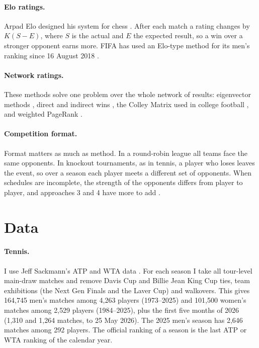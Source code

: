 \documentclass[11pt]{article}
\begin{document}
\paragraph{Elo ratings.} Arpad Elo designed his system for chess \citep{elo1978}. After each match a rating changes by $K(S-E)$, where $S$ is the actual and $E$ the expected result, so a win over a stronger opponent earns more. FIFA has used an Elo-type method for its men's ranking since 16 August 2018 \citep{wiki_fifa}.

\paragraph{Network ratings.} These methods solve one problem over the whole network of results: eigenvector methods \citep{keener1993}, direct and indirect wins \citep{park2005}, the Colley Matrix used in college football \citep{colley2002,wiki_colley}, and weighted PageRank \citep{radicchi2011,govan2008,lazova2015}.

\paragraph{Competition format.} Format matters as much as method. In a round-robin league all teams face the same opponents. In knockout tournaments, as in tennis, a player who loses leaves the event, so over a season each player meets a different set of opponents. When schedules are incomplete, the strength of the opponents differs from player to player, and approaches 3 and 4 have more to add \citep{zhou2020}.

\section{Data}

\paragraph{Tennis.} I use Jeff Sackmann's ATP and WTA data \citep{sackmann,wtadata}. For each season I take all tour-level main-draw matches and remove Davis Cup and Billie Jean King Cup ties, team exhibitions (the Next Gen Finals and the Laver Cup) and walkovers. This gives 164{,}745 men's matches among 4{,}263 players (1973--2025) and 101{,}500 women's matches among 2{,}529 players (1984--2025), plus the first five months of 2026 (1{,}310 and 1{,}264 matches, to 25 May 2026). The 2025 men's season has 2{,}646 matches among 292 players. The official ranking of a season is the last ATP or WTA ranking of the calendar year.
\end{document}

